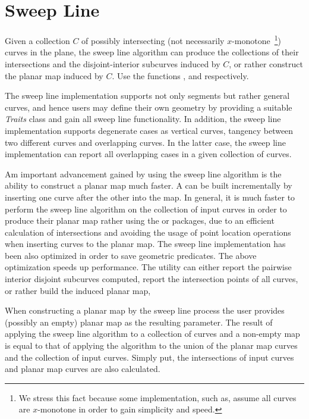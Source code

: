 \section{Sweep Line}


Given a collection $C$ of possibly intersecting 
(not necessarily $x$-monotone~\footnote{
We stress this fact because some implementation, such as, 
 assume all curves are $x$-monotone 
in order to gain simplicity and speed.}) 
curves in the plane, the sweep line algorithm can produce the collections of their 
intersections and the disjoint-interior subcurves induced by $C$, or rather 
construct the planar map induced by $C$. Use the functions ,
 and  respectively.

The sweep line implementation supports not only segments but rather 
general curves, and hence users may define their own geometry by providing a 
suitable {\em Traits} class and gain all sweep line functionality. 
In addition, the sweep line implementation supports degenerate cases as  
vertical curves, tangency between two different curves and overlapping curves. 
In the latter case, the sweep line implementation can report all overlapping cases 
in a given collection of curves. 
 
Am important advancement gained by using the sweep line algorithm 
is the ability to construct a planar map much faster.
A  can be built incrementally by
inserting one curve after the other into the map. 
In general, it is much faster to perform the sweep line algorithm on
the collection of input curves in order to produce their planar map 
rather using the  
or  packages, due to an 
efficient calculation of intersections and avoiding the usage of 
point location operations when inserting curves to the planar map. 
The sweep line implementation has been also optimized in order to 
save geometric predicates. The above optimization speeds up performance. 
The utility can either report the pairwise interior disjoint subcurves
computed, report the intersection points of all curves, 
or rather build the induced planar map, 

When constructing a planar map by the sweep line process the user 
provides (possibly an empty) planar map as the resulting parameter. 
The result of applying the sweep line algorithm to a 
collection of curves and a non-empty map is equal to that 
of applying the algorithm to the union of the
planar map curves and the collection of input curves. Simply put,
the intersections of input curves and planar map curves are also
calculated.

